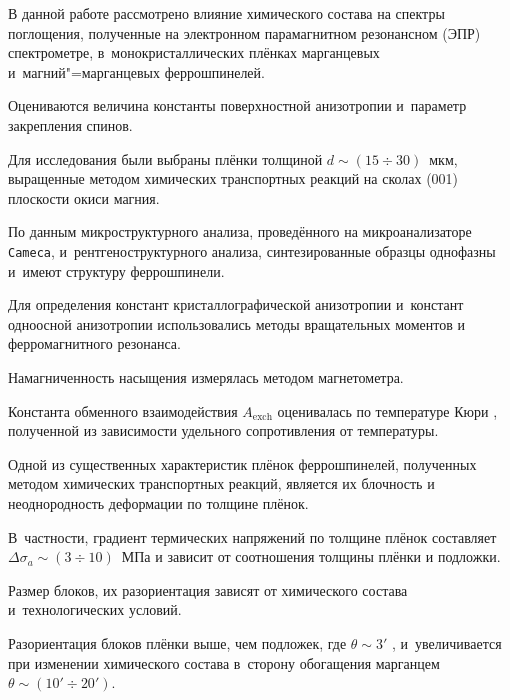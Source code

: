 В данной работе рассмотрено влияние химического состава на спектры поглощения, полученные на электронном парамагнитном резонансном (ЭПР) спектрометре, в~монокристаллических плёнках марганцевых и~магний"=марганцевых феррошпинелей. 

Оцениваются величина константы поверхностной анизотропии и~параметр закрепления спинов.



\smallskip




Для исследования были выбраны плёнки толщиной $d\sim (15\div30)$~мкм, выращенные методом химических транспортных реакций на сколах (001) плоскости окиси магния.



По данным микроструктурного анализа, проведённого на микроанализаторе {\tt Cameca}, и~рентгеноструктурного анализа, синтезированные образцы однофазны и~имеют структуру феррошпинели.



Для определения констант кристаллографической анизотропии и~констант одноосной анизотропии использовались методы вращательных моментов и ферромагнитного резонанса. 

Намагниченность насыщения измерялась методом магнетометра.



Константа обменного взаимодействия $A_\text{exch}$ оценивалась по температуре Кюри \cite{velik:M3}, полученной из зависимости удельного сопротивления от температуры.



Одной из существенных характеристик плёнок феррошпинелей, полученных методом химических транспортных реакций, является их блочность и неоднородность деформации по толщине плёнок. 

В~частности, градиент термических напряжений по толщине плёнок составляет $ \Delta\sigma_a \sim (3\div10)$~МПа и зависит от соотношения толщины плёнки и подложки.











Размер блоков, их разориентация зависят от химического состава и~технологических условий.  

Разориентация блоков плёнки выше, чем подложек, где $\theta \sim 3'$  \cite{velik:M8}, и~увеличивается при изменении химического состава в~сторону обогащения марганцем $\theta \sim (10' \div 20')$. 

